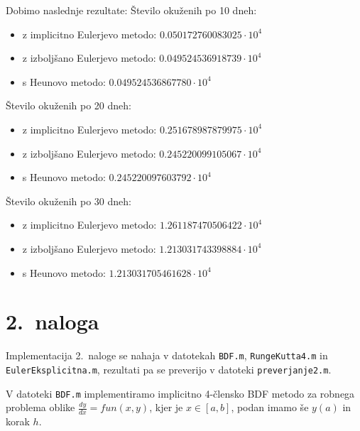 \documentclass[a4paper,12pt]{article}
\begin{document}
Dobimo naslednje rezultate:
Število okuženih po 10 dneh:
\begin{itemize}
    \item z implicitno Eulerjevo metodo: $0.050172760083025 \cdot 10^4$
    \item z izboljšano Eulerjevo metodo: $0.049524536918739 \cdot 10^4$
    \item s Heunovo metodo: $0.049524536867780 \cdot 10^4$
\end{itemize}

Število okuženih po 20 dneh:
\begin{itemize}
    \item z implicitno Eulerjevo metodo: $0.251678987879975 \cdot 10^4$
    \item z izboljšano Eulerjevo metodo: $0.245220099105067 \cdot 10^4$
    \item s Heunovo metodo: $0.245220097603792 \cdot 10^4$
\end{itemize}

Število okuženih po 30 dneh:
\begin{itemize}
    \item z implicitno Eulerjevo metodo: $1.261187470506422 \cdot 10^4$
    \item z izboljšano Eulerjevo metodo: $1.213031743398884 \cdot 10^4$
    \item s Heunovo metodo: $1.213031705461628 \cdot 10^4$
\end{itemize}

\section*{2.\ naloga}

Implementacija 2.\ naloge se nahaja v datotekah 
\texttt{BDF.m}, \texttt{RungeKutta4.m} in \texttt{EulerEksplicitna.m}, 
rezultati pa se preverijo v datoteki \texttt{preverjanje2.m}.

V datoteki \texttt{BDF.m} implementiramo implicitno 4-člensko BDF
metodo za robnega problema oblike 
\(\frac{dy}{dx}=fun(x,y)\), kjer je \(x\in [a,b]\), podan imamo še \(y(a)\) in korak \(h\).
\end{document}
